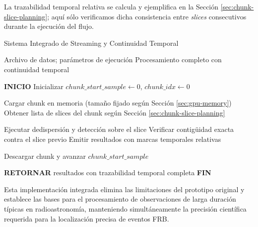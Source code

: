 La trazabilidad temporal relativa se calcula y ejemplifica en la Sección \ref{sec:chunk-slice-planning}; aquí sólo verificamos dicha consistencia entre \emph{slices} consecutivos durante la ejecución del flujo.

\begin{algorithm}[H]
\caption{Sistema Integrado de Streaming y Continuidad Temporal}
\label{alg:streaming-continuity}
\begin{algorithmic}[1]
\Require Archivo de datos; parámetros de ejecución
\Ensure Procesamiento completo con continuidad temporal

\State \textbf{INICIO}
\State Inicializar $chunk\_start\_sample \leftarrow 0$, $chunk\_idx \leftarrow 0$

    \State Cargar chunk en memoria (tamaño fijado según Sección \ref{sec:gpu-memory})
    \State Obtener lista de slices del chunk según Sección \ref{sec:chunk-slice-planning}

        \State Ejecutar dedispersión y detección sobre el slice
        \State Verificar contigüidad exacta contra el slice previo
        \State Emitir resultados con marcas temporales relativas
    \EndFor

    \State Descargar chunk y avanzar $chunk\_start\_sample$
\EndWhile

\State \textbf{RETORNAR} resultados con trazabilidad temporal completa
\State \textbf{FIN}
\end{algorithmic}
\end{algorithm}

Esta implementación integrada elimina las limitaciones del prototipo original y establece las bases para el procesamiento de observaciones de larga duración típicas en radioastronomía, manteniendo simultáneamente la precisión científica requerida para la localización precisa de eventos FRB.

